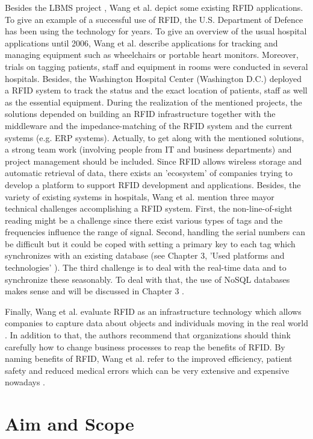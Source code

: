 Besides the LBMS project \cite[p.2 ff.]{casestudy}, Wang et al. depict some existing RFID applications. To give an example of a successful use of RFID, the U.S. Department of Defence has been using the technology for years. 
To give an overview of the usual hospital applications until 2006, Wang et al. describe applications for tracking and managing equipment such as wheelchairs or portable heart monitors. Moreover, trials on tagging patients, staff and equipment in rooms were conducted in several hospitals. Besides, the Washington Hospital Center (Washington D.C.) deployed a RFID system to track the status and the exact location of patients, staff as well as the essential equipment.
During the realization of the mentioned projects, the solutions depended on building an RFID infrastructure together with the middleware and the impedance-matching of the RFID system and the current systems (e.g. \ac{ERP} systems). Actually, to get along with the mentioned solutions, a strong team work (involving people from IT and business departments) and project management should be included. 
Since RFID allows wireless storage and automatic retrieval of data, there exists an 'ecosystem' of companies trying to develop a platform to support RFID development and applications.  Besides, the variety of existing systems in hospitals, Wang et al. mention three mayor technical challenges accomplishing a RFID system. First, the non-line-of-sight reading might be a challenge since there exist various types of tags and the frequencies influence the range of signal. Second, handling the serial numbers can be difficult but it could be coped with setting a primary key to each tag which synchronizes with an existing database (see Chapter 3, 'Used platforms and technologies' \pageref{platforms}). The third challenge is to deal with the real-time data and to synchronize these seasonably. To deal with that, the use of NoSQL databases makes sense and will be discussed in Chapter 3 \pageref{nosql}.

Finally, Wang et al. evaluate RFID as an infrastructure technology which allows companies to capture data about objects and individuals moving in the real world \cite[p.7]{casestudy}. In addition to that, the authors recommend that organizations should think carefully how to change business processes to reap the benefits of RFID. By naming benefits of RFID, Wang et al. refer to the improved efficiency, patient safety and reduced medical errors which can be very extensive and expensive nowadays \cite{casestudy}.

\section{Aim and Scope}


